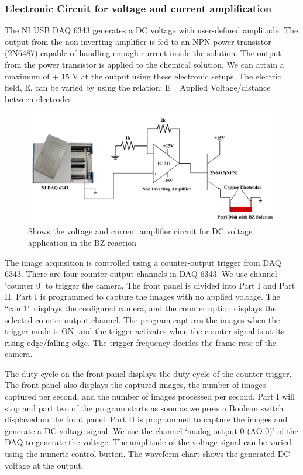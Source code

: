 \documentclass[journal=jacsat,manuscript=article]{achemso}
\begin{document}
\subsubsection{Electronic Circuit for voltage and current amplification}
The NI USB DAQ 6343 generates a DC voltage with user-defined
amplitude. The output from the non-inverting amplifier is fed to an
NPN power transistor (2N6487) capable of handling enough current
inside the solution. The output from the power transistor is applied
to the chemical solution. We can attain a maximum of + 15 V at the
output using these electronic setups. The electric field, E, can be
varied by using the relation: E= Applied Voltage/distance between
electrodes
\begin{figure}[H]
    \centering
    \includegraphics[width=\linewidth]{pulse circuit - Copy.jpg}
    \caption{Shows the voltage and current amplifier circuit for DC
      voltage application in the BZ reaction}
    \label{fig:ex2}
\end{figure}


The image acquisition is controlled using a counter-output trigger
from DAQ 6343. There are four counter-output channels in DAQ 6343. We
use channel ‘counter 0’ to trigger the camera. The front panel is
divided into Part I and Part II. Part I is programmed to capture the
images with no applied voltage. The “cam1” displays the configured
camera, and the counter option displays the selected counter output
channel. The program captures the images when the trigger mode is ON,
and the trigger activates when the counter signal is at its rising
edge/falling edge. The trigger frequency decides the frame rate of the
camera.

The duty cycle on the front panel displays the duty cycle of the
counter trigger. The front panel also displays the captured images,
the number of images captured per second, and the number of images
processed per second. Part I will stop and part two of the program
starts as soon as we press a Boolean switch displayed on the front
panel. Part II is programmed to capture the images and generate a DC
voltage signal. We use the channel ‘analog output 0 (AO 0)’ of the DAQ
to generate the voltage. The amplitude of the voltage signal can be
varied using the numeric control button. The waveform chart shows the
generated DC voltage at the output.
\end{document}
